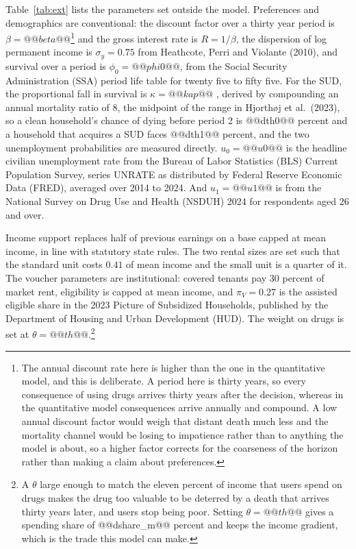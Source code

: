 \documentclass[10pt]{article}
\begin{document}
Table~\ref{tab:ext} lists the parameters set outside the model. Preferences and
demographics are conventional: the discount factor over a thirty year period
is $\beta = @@beta@@$\footnote{The annual discount rate here is higher than the one in the
quantitative model, and this is deliberate. A period here is thirty years, so
every consequence of using drugs arrives thirty years after the decision,
whereas in the quantitative model consequences arrive annually and compound. A
low annual discount factor would weigh that distant death much less and the
mortality channel would be losing to impatience rather than to anything the model
is about, so a higher factor corrects for the coarseness of the horizon rather
than making a claim about preferences.} and the gross interest rate is
$R=1/\beta$, the dispersion of log permanent income is
$\sigma_y = 0.75$ from Heathcote, Perri and Violante (2010), and survival over
a period is $\phi_0 = @@phi0@@$, from the Social Security Administration (SSA) period life table for twenty
five to fifty five. For the SUD, the
proportional fall in survival is $\kappa = @@kap@@$ , derived by compounding an annual mortality ratio of $8$, the midpoint of the range in Hjorth\o j et al.\
(2023), so a clean household's chance of dying before period 2 is @@dth0@@
percent and a household that acquires a SUD faces @@dth1@@ percent,
and the two unemployment probabilities are measured directly. $u_0 = @@u0@@$
is the headline civilian unemployment rate from the Bureau of Labor Statistics
(BLS) Current Population Survey, series UNRATE as distributed by Federal Reserve
Economic Data (FRED), averaged over 2014 to 2024. And $u_1 = @@u1@@$ is from the
National Survey on Drug Use and Health (NSDUH) 2024 for respondents aged 26 and
over.

Income support replaces half of previous earnings on a base capped at mean
income, in line with statutory state rules. The two rental sizes are set
such that the standard unit costs $0.41$ of mean income and the small unit is a
quarter of it. The voucher parameters are institutional: covered
tenants pay $30$ percent of market rent, eligibility is capped at mean income,
and $\pi_V = 0.27$ is the assisted eligible share in the 2023 Picture of Subsidized
Households, published by the Department of Housing and Urban Development (HUD).
The weight on drugs is set at $\theta = @@th@@$.\footnote{A $\theta$ large
enough to match the eleven percent of income that users spend on drugs makes the
drug too valuable to be deterred by a death that arrives thirty years later, and
users stop being poor. Setting $\theta = @@th@@$ gives a spending share of
@@dshare_m@@ percent and keeps the income gradient, which is the trade this model
can make.}
\end{document}
